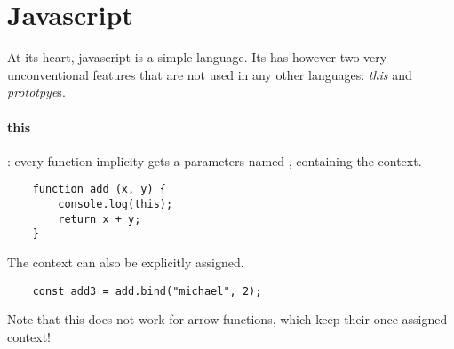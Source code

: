 \section{Javascript}
At its heart, javascript is a simple language. Its has however two very unconventional features that are not used in any other languages: \emph{this} and \emph{prototpye}s.  

 \paragraph{this}: every function implicity gets a parameters named , containing the context. 
\begin{lstlisting}
    function add (x, y) {
        console.log(this);
        return x + y;
    }
\end{lstlisting}
The context  can also be explicitly assigned.
\begin{lstlisting}
    const add3 = add.bind("michael", 2);
\end{lstlisting}
Note that this does not work for arrow-functions, which keep their once assigned context!


